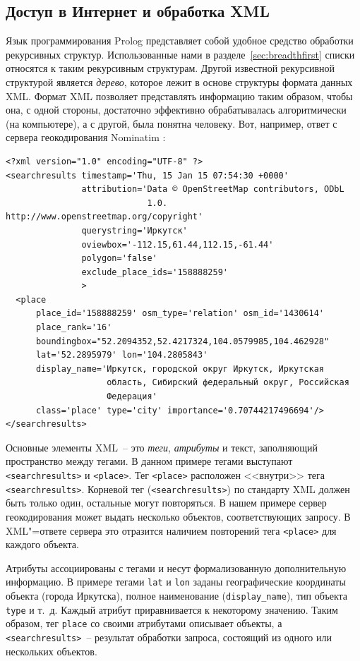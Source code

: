 \documentclass[a4paper,14pt, openany, twoside, draft]{extbook} %
\begin{document}
\subsection{Доступ в Интернет и обработка XML}
\label{sec:inetxml}

Язык программирования Prolog представляет собой удобное средство обработки рекурсивных структур.  Использованные нами в разделе~\ref{sec:breadthfirst} списки относятся к таким рекурсивным структурам.  Другой известной рекурсивной структурой является \emph{дерево}, которое лежит в основе структуры формата данных XML.  Формат XML позволяет представлять информацию таким образом, чтобы она, с одной стороны, достаточно эффективно обрабатывалась алгоритмически (на компьютере), а с другой, была понятна человеку.  Вот, например, ответ с сервера геокодирования \foreignlanguage{latin}{Nominatim} \cite{nominatim}:

\begin{verbatim}
<?xml version="1.0" encoding="UTF-8" ?>
<searchresults timestamp='Thu, 15 Jan 15 07:54:30 +0000'
               attribution='Data © OpenStreetMap contributors, ODbL
                            1.0. http://www.openstreetmap.org/copyright'
               querystring='Иркутск'
               oviewbox='-112.15,61.44,112.15,-61.44'
               polygon='false'
               exclude_place_ids='158888259'
               >
  <place
      place_id='158888259' osm_type='relation' osm_id='1430614'
      place_rank='16'
      boundingbox="52.2094352,52.4217324,104.0579985,104.462928"
      lat='52.2895979' lon='104.2805843'
      display_name='Иркутск, городской округ Иркутск, Иркутская
                    область, Сибирский федеральный округ, Российская
                    Федерация'
      class='place' type='city' importance='0.70744217496694'/>
</searchresults>
\end{verbatim}


Основные элементы XML~-- это \emph{теги}, \emph{атрибуты} и текст, заполняющий пространство между тегами.  В данном примере тегами выступают \texttt{<searchresults>} и \texttt{<place>}.  Тег \texttt{<place>} расположен <<внутри>> тега \texttt{<searchresults>}.  Корневой тег (\texttt{<searchresults>}) по стандарту XML должен быть только один, остальные могут повторяться.  В нашем примере сервер геокодирования может выдать несколько объектов, соответствующих запросу.  В XML"=ответе сервера это отразится наличием повторений тега \texttt{<place>} для каждого объекта.

Атрибуты ассоциированы с тегами и несут формализованную дополнительную информацию.  В примере тегами \texttt{lat} и \texttt{lon} заданы географические координаты объекта (города Иркутска), полное наименование (\texttt{display\_name}), тип объекта \texttt{type} и т.~д.  Каждый атрибут приравнивается к некоторому значению.  Таким образом, тег \texttt{place} со своими атрибутами описывает объекты, а \texttt{<searchresults>}~-- результат обработки запроса, состоящий из одного или нескольких объектов.
\end{document}
